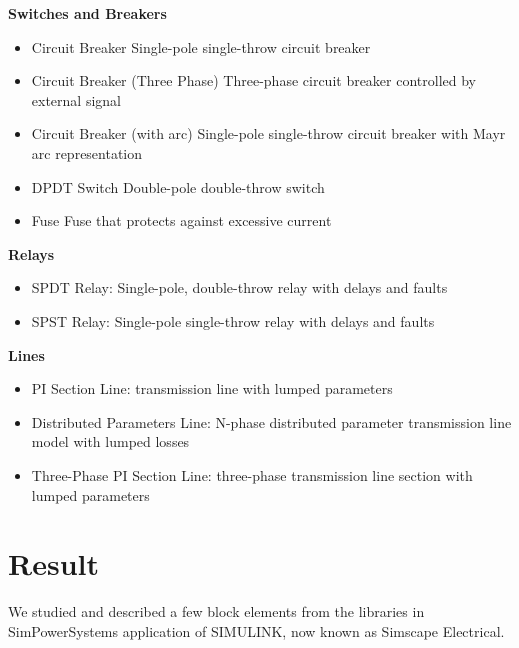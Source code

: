 \documentclass[a4paper,12pt]{article}
\begin{document}
    {\bf Switches and Breakers}
    \begin{itemize}
      \item Circuit Breaker	Single-pole single-throw circuit breaker
      \item Circuit Breaker (Three Phase)	Three-phase circuit breaker controlled by external signal
      \item Circuit Breaker (with arc)	Single-pole single-throw circuit breaker with Mayr arc representation
      \item DPDT Switch	Double-pole double-throw switch
      \item Fuse	Fuse that protects against excessive current
    \end{itemize}
    {\bf Relays}
    \begin{itemize}
      \item SPDT Relay: Single-pole, double-throw relay with delays and faults
      \item SPST Relay: Single-pole single-throw relay with delays and faults
    \end{itemize}
    {\bf Lines}
    \begin{itemize}
      \item PI Section Line: transmission line with lumped parameters
      \item Distributed Parameters Line: N-phase distributed parameter transmission line model with lumped losses
      \item Three-Phase PI Section Line: three-phase transmission line section with lumped parameters
    \end{itemize}

  \section{Result}
  We studied and described a few block elements from the libraries in SimPowerSystems
  application of SIMULINK, now known as Simscape Electrical.
\end{document}
